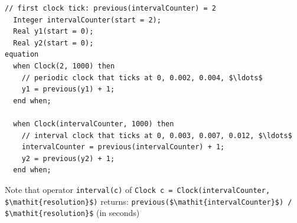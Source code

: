 \begin{operatordefinition*}[Clock]
\begin{semantics}
\begin{example}
\begin{lstlisting}[language=modelica]
  // first clock tick: previous(intervalCounter) = 2
  Integer intervalCounter(start = 2);
  Real y1(start = 0);
  Real y2(start = 0);
equation
  when Clock(2, 1000) then
    // periodic clock that ticks at 0, 0.002, 0.004, $\ldots$
    y1 = previous(y1) + 1;
  end when;

  when Clock(intervalCounter, 1000) then
    // interval clock that ticks at 0, 0.003, 0.007, 0.012, $\ldots$
    intervalCounter = previous(intervalCounter) + 1;
    y2 = previous(y2) + 1;
  end when;
\end{lstlisting}

Note that operator \lstinline!interval(c)! of \lstinline!Clock c = Clock(intervalCounter, $\mathit{resolution}$)! returns:\newline
\lstinline!previous($\mathit{intervalCounter}$) / $\mathit{resolution}$! (in seconds)
\end{example}
\end{semantics}
\end{operatordefinition*}

